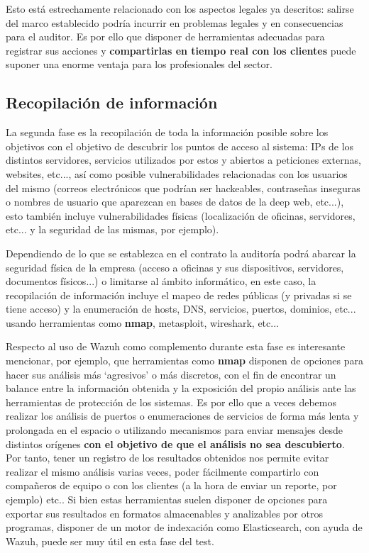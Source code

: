 Esto está estrechamente relacionado con los aspectos legales ya descritos: salirse del marco establecido podría incurrir en problemas legales y en consecuencias para el auditor. Es por ello que disponer de herramientas adecuadas para registrar sus acciones y \textbf{compartirlas en tiempo real con los clientes} puede suponer una enorme ventaja para los profesionales del sector.

\subsection{Recopilación de información}

La segunda fase es la recopilación de toda la información posible sobre los objetivos con el objetivo de descubrir los puntos de acceso al sistema: IPs de los distintos servidores, servicios utilizados por estos y abiertos a peticiones externas, websites, etc..., así como posible vulnerabilidades relacionadas con los usuarios del mismo (correos electrónicos que podrían ser hackeables, contraseñas inseguras o nombres de usuario que aparezcan en bases de datos de la deep web, etc...), esto también incluye vulnerabilidades físicas (localización de oficinas, servidores, etc... y la seguridad de las mismas, por ejemplo).

Dependiendo de lo que se establezca en el contrato la auditoría podrá abarcar la seguridad física de la empresa (acceso a oficinas y sus dispositivos, servidores, documentos físicos...) o limitarse al ámbito informático, en este caso, la recopilación de información incluye el mapeo de redes públicas (y privadas si se tiene acceso) y la enumeración de hosts, DNS, servicios, puertos, dominios, etc... usando herramientas como \textbf{nmap}, metasploit\cite{kennedy_2011}, wireshark, etc...

Respecto al uso de Wazuh como complemento durante esta fase es interesante mencionar, por ejemplo, que herramientas como \textbf{nmap} disponen de opciones para hacer sus análisis más `agresivos' o más discretos, con el fin de encontrar un balance entre la información obtenida y la exposición del propio análisis ante las herramientas de protección de los sistemas. Es por ello que a veces debemos realizar los análisis de puertos o enumeraciones de servicios de forma más lenta y prolongada en el espacio o utilizando mecanismos para enviar mensajes desde distintos orígenes \textbf{con el objetivo de que el análisis no sea descubierto}. Por tanto, tener un registro de los resultados obtenidos nos permite evitar realizar el mismo análisis varias veces, poder fácilmente compartirlo con compañeros de equipo o con los clientes (a la hora de enviar un reporte, por ejemplo) etc.. Si bien estas herramientas suelen disponer de opciones para exportar sus resultados en formatos almacenables y analizables por otros programas, disponer de un motor de indexación como Elasticsearch, con ayuda de Wazuh, puede ser muy útil en esta fase del test.


